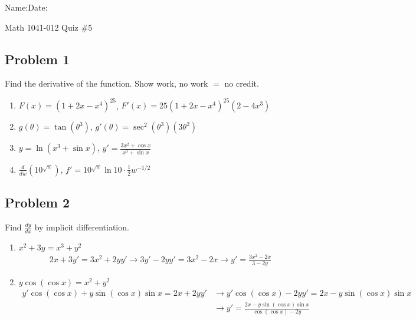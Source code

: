 \documentclass[10pt]{book}
\theoremstyle{definition}
\begin{document}
\begin{flushleft}
Name:\underline{\hspace{13cm}}Date:\underline{\hspace{2cm}}
\end{flushleft}
\begin{center}
{\Large Math 1041-012 \hspace{0.5cm} Quiz \#5}
\end{center}
\vspace{0.2 cm}
\subsection*{Problem 1} Find the derivative of the function. Show work, no work $=$ no credit.
\begin{enumerate}[label=(\alph*)]
    \item $F(x)=(1+2x-x^4)^{25}$,    $F'(x)=25(1+2x-x^4)^{25}(2-4x^3)$\vspace{4cm}
    \item $g(\theta)=\tan(\theta^3)$, $g'(\theta)=\sec^2(\theta^3)(3\theta^2)$\vspace{4cm}
    \item $y=\ln(x^3+\sin x)$, $y'=\frac{3x^2+\cos x}{x^3+\sin x}$\vspace{4cm}
    \item $\displaystyle\frac{d}{dw}\left(10^{\sqrt{w}}\right)$, $f'=10^{\sqrt{w}}\ln 10\cdot\frac{1}{2}w^{-1/2}$
\end{enumerate}
\clearpage
\subsection*{Problem 2} Find $\displaystyle\frac{dy}{dx}$ by implicit differentiation.
\begin{enumerate}[label=(\alph*)]
    \item $x^2+3y=x^3+y^2$
    \begin{align*}
        2x+3y'=3x^2+2yy'\longrightarrow 3y'-2yy'=3x^2-2x\longrightarrow y'=\frac{3x^2-2x}{3-2y}
    \end{align*}
    \vspace{1cm}
    \item $y\cos (\cos x)=x^2+y^2$
    \begin{align*}
        y'\cos(\cos x)+y\sin(\cos x)\sin x=2x+2yy'&\longrightarrow y'\cos(\cos x)-2yy'=2x-y\sin(\cos x)\sin x\\[4pt]
        &\longrightarrow y'=\frac{2x-y\sin(\cos x)\sin x}{\cos(\cos x)-2y}
    \end{align*}
\end{enumerate}
\end{document}
